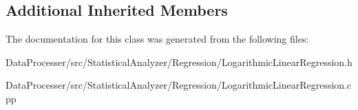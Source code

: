 \subsection*{Additional Inherited Members}


The documentation for this class was generated from the following files\+:\begin{DoxyCompactItemize}
\item 
Data\+Processer/src/\+Statistical\+Analyzer/\+Regression/Logarithmic\+Linear\+Regression.\+h\item 
Data\+Processer/src/\+Statistical\+Analyzer/\+Regression/Logarithmic\+Linear\+Regression.\+cpp\end{DoxyCompactItemize}
